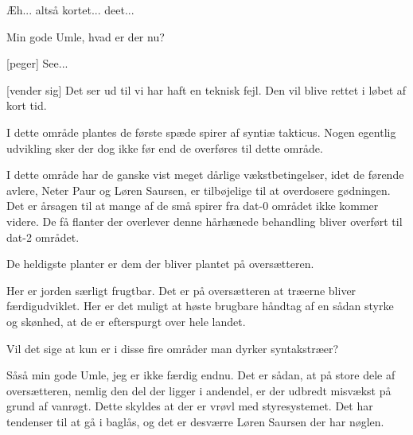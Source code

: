 \documentclass[a4paper,11pt]{article}
\begin{document}
\begin{sketch}

   Æh... altså kortet... deet...

   Min gode Umle, hvad er der nu?

  [peger] See...

  [vender sig] Det ser ud til vi har haft en teknisk fejl.
  Den vil blive rettet i løbet af kort tid.


   I dette område plantes de første spæde spirer af syntiæ
  takticus.  Nogen egentlig udvikling sker der dog ikke før end de
  overføres til dette område.


   I dette område har de ganske vist meget dårlige
  vækstbetingelser, idet de førende avlere, Neter Paur og Løren
  Saursen, er tilbøjelige til at overdosere gødningen.  Det er årsagen
  til at mange af de små spirer fra dat-0 området ikke kommer videre.
  De få flanter der overlever denne hårhænede behandling bliver
  overført til dat-2 området.


   De heldigste planter er dem der bliver plantet på
  oversætteren.


   Her er jorden særligt frugtbar.  Det er på oversætteren at
  træerne bliver færdigudviklet.  Her er det muligt at høste brugbare
  håndtag af en sådan styrke og skønhed, at de er efterspurgt over
  hele landet.

   Vil det sige at kun er i disse fire områder man dyrker
  syntakstræer?

   Såså min gode Umle, jeg er ikke færdig endnu.  Det er
  sådan, at på store dele af oversætteren, nemlig den del der ligger i
  andendel, er der udbredt misvækst på grund af vanrøgt.  Dette
  skyldes at der er vrøvl med styresystemet.  Det har tendenser til at
  gå i baglås, og det er desværre Løren Saursen der har nøglen.


\end{sketch}
\end{document}
